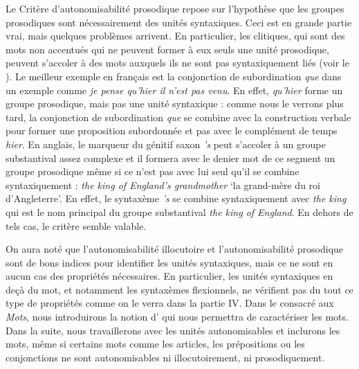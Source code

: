 \ea\label{ex:3.2-prosodie}
    \z
\z

\begin{sloppypar}
Le Critère d’autonomisabilité prosodique repose sur l’hypothèse que les groupes prosodiques sont nécessairement des unités syntaxiques. Ceci est en grande partie vrai, mais quelques problèmes arrivent. En particulier, les clitiques, qui sont des mots non accentués qui ne peuvent former à eux seuls une unité prosodique, peuvent s’accoler à des mots auxquels ils ne sont pas syntaxiquement liés (voir le ). Le meilleur exemple en français est la conjonction de subordination \textit{que} dans un exemple comme \textit{je pense {\textbar} qu’hier {\textbar} il n’est pas venu}. En effet, \textit{qu’hier} forme un groupe prosodique, mais pas une unité syntaxique : comme nous le verrons plus tard, la conjonction de subordination \textit{que} se combine avec la construction verbale pour former une proposition subordonnée et pas avec le complément de temps \textit{hier}. En anglais, le marqueur du génitif saxon \textit{’s} peut s’accoler à un groupe substantival assez complexe et il formera avec le denier mot de ce segment un groupe prosodique même si ce n’est pas avec lui seul qu’il se combine syntaxiquement : \textit{the king {\textbar} of England’s {\textbar} grandmother} ‘la grand-mère du roi d’Angleterre’. En effet, le syntaxème \textit{’s} se combine syntaxiquement avec \textit{the king} qui est le nom principal du groupe substantival \textit{the king of England}. En dehors de tels cas, le critère semble valable.
\end{sloppypar}

On aura noté que l’autonomisabilité illocutoire et l’autonomisabilité prosodique sont de bons indices pour identifier les unités syntaxiques, mais ce ne sont en aucun cas des propriétés nécessaires. En particulier, les unités syntaxiques en deçà du mot, et notamment les syntaxèmes flexionnels, ne vérifient pas du tout ce type de propriétés comme on le verra dans la partie IV. Dans le  consacré aux \textit{Mots}, nous introduirons la notion d’ qui nous permettra de caractériser les mots. Dans la suite, nous travaillerons avec les unités autonomisables et inclurons les mots, même si certains mots comme les articles, les prépositions ou les conjonctions ne sont autonomisables ni illocutoirement, ni prosodiquement.

